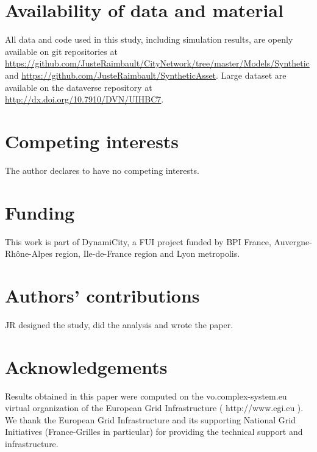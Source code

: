 \documentclass{bmcart}
\begin{document}
\begin{backmatter}


\section*{Availability of data and material}

All data and code used in this study, including simulation results, are openly available on git repositories at \url{https://github.com/JusteRaimbault/CityNetwork/tree/master/Models/Synthetic} and \url{https://github.com/JusteRaimbault/SyntheticAsset}. Large dataset are available on the dataverse repository at \url{http://dx.doi.org/10.7910/DVN/UIHBC7}.

\vspace{-0.2cm}


\section*{Competing interests}

The author declares to have no competing interests.

\vspace{-0.2cm}

\section*{Funding}

This work is part of DynamiCity, a FUI project funded by BPI France, Auvergne-Rh{\^o}ne-Alpes region, Ile-de-France region and Lyon metropolis.

\vspace{-0.2cm}

\section*{Authors' contributions}

JR designed the study, did the analysis and wrote the paper.

\vspace{-0.2cm}

\section*{Acknowledgements}

Results obtained in this paper were computed on the vo.complex-system.eu virtual organization of the European Grid Infrastructure ( http://www.egi.eu ). We thank the European Grid Infrastructure and its supporting National Grid Initiatives (France-Grilles in particular) for providing the technical support and infrastructure.


 \vspace{-0.2cm}
  




\end{backmatter}
\end{document}
